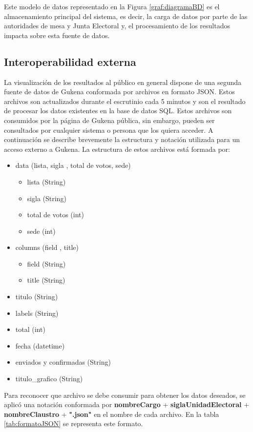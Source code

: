 Este modelo de datos representado en la Figura \ref{graf:diagramaBD} es el almacenamiento principal del sistema, es decir, la carga de datos por parte de las autoridades de mesa y Junta Electoral y, el procesamiento de los resultados impacta sobre esta fuente de datos. 

\subsection{Interoperabilidad externa}
La visualización de los resultados al público en general dispone de una segunda fuente de datos de Gukena conformada por archivos en formato JSON. Estos archivos son actualizados durante el escrutinio cada 5 minutos y son el resultado de procesar los datos existentes en la base de datos SQL. Estos archivos son consumidos por la página de Gukena pública, sin embargo, pueden ser consultados por cualquier sistema o persona que los quiera acceder. A continuación se describe brevemente la estructura y notación utilizada para un acceso externo a Gukena.
La estructura de estos archivos está formada por:
\begin{itemize}
    \item data (lista, sigla , total de votos, sede)
    \begin{itemize}
        \item lista (String)
        \item sigla (String)
        \item total de votos (int)
        \item sede (int)
    \end{itemize}
    \item columns (field , title)
    \begin{itemize}
        \item field (String)
        \item title (String)
    \end{itemize}
    \item titulo (String)
    \item labels (String)
    \item total (int)
    \item fecha (datetime)
    \item enviados y confirmadas (String)
    \item titulo\_grafico (String)
\end{itemize}
Para reconocer que archivo se debe consumir para obtener los datos deseados,  se aplicó una notación conformada por \textbf{nombreCargo} + \textbf{siglaUnidadElectoral} + \textbf{nombreClaustro} + \textbf{".json"} en el nombre de cada archivo. En la tabla \ref{tab:formatoJSON} se representa este formato.

